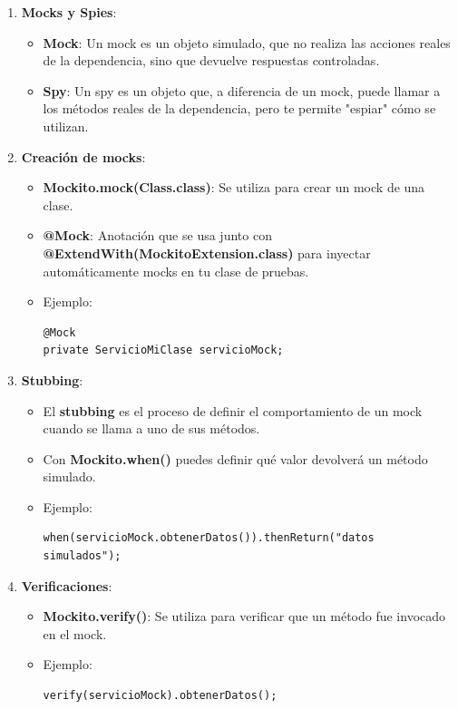 \documentclass[11pt]{article}
\begin{document}
\begin{enumerate}
\item \textbf{\textbf{Mocks y Spies}}:
\begin{itemize}
\item \textbf{\textbf{Mock}}: Un mock es un objeto simulado, que no realiza las acciones reales de la dependencia, sino que devuelve respuestas controladas.
\item \textbf{\textbf{Spy}}: Un spy es un objeto que, a diferencia de un mock, puede llamar a los métodos reales de la dependencia, pero te permite "espiar" cómo se utilizan.
\end{itemize}

\item \textbf{\textbf{Creación de mocks}}:
\begin{itemize}
\item \textbf{\textbf{Mockito.mock(Class.class)}}: Se utiliza para crear un mock de una clase.
\item \textbf{\textbf{@Mock}}: Anotación que se usa junto con \textbf{\textbf{@ExtendWith(MockitoExtension.class)}} para inyectar automáticamente mocks en tu clase de pruebas.
\item Ejemplo:
\begin{verbatim}
@Mock
private ServicioMiClase servicioMock;
\end{verbatim}
\end{itemize}

\item \textbf{\textbf{Stubbing}}:
\begin{itemize}
\item El \textbf{\textbf{stubbing}} es el proceso de definir el comportamiento de un mock cuando se llama a uno de sus métodos.
\item Con \textbf{\textbf{Mockito.when()}} puedes definir qué valor devolverá un método simulado.
\item Ejemplo:
\begin{verbatim}
when(servicioMock.obtenerDatos()).thenReturn("datos simulados");
\end{verbatim}
\end{itemize}

\item \textbf{\textbf{Verificaciones}}:
\begin{itemize}
\item \textbf{\textbf{Mockito.verify()}}: Se utiliza para verificar que un método fue invocado en el mock.
\item Ejemplo:
\begin{verbatim}
verify(servicioMock).obtenerDatos();
\end{verbatim}
\end{itemize}


\end{enumerate}
\end{document}

